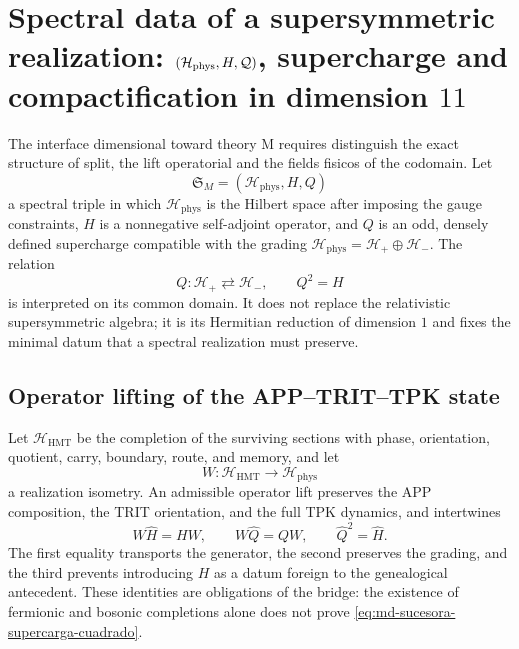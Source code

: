 \section{Spectral data of a supersymmetric realization: \((\mathcal H_{\rm phys},H,\mathcal Q)\), supercharge and compactification in dimension \(11\)}
\label{sec:md-sucesora-terna-supercarga-m}

The interface dimensional toward theory M requires distinguish the exact structure
of split, the lift operatorial and the fields fisicos of the codomain. Let
\[
 \mathfrak S_M=(\mathcal H_{\mathrm{phys}},H,Q)
\]
a spectral triple in which \(\mathcal H_{\mathrm{phys}}\) is the Hilbert
space after imposing the gauge constraints, \(H\) is a nonnegative
self-adjoint operator, and \(Q\) is an odd, densely defined supercharge
compatible with the grading
\(\mathcal H_{\mathrm{phys}}=\mathcal H_+\oplus\mathcal H_-\). The relation
\begin{equation}
 Q:\mathcal H_+\rightleftarrows\mathcal H_-,
 \qquad
 Q^2=H
 \label{eq:md-sucesora-supercarga-cuadrado}
\end{equation}
is interpreted on its common domain. It does not replace the relativistic
supersymmetric algebra; it is its Hermitian reduction of dimension \(1\) and fixes the minimal datum
that a spectral realization must preserve.

\subsection{Operator lifting of the APP--TRIT--TPK state}

Let \(\mathcal H_{\mathrm{HMT}}\) be the completion of the surviving sections
with phase, orientation, quotient, carry, boundary, route, and
memory, and let
\[
 W:\mathcal H_{\mathrm{HMT}}\longrightarrow\mathcal H_{\mathrm{phys}}
\]
a realization isometry. An admissible operator lift preserves
the APP composition, the TRIT orientation, and the full TPK dynamics,
and intertwines
\begin{equation}
 W\widehat H=HW,
 \qquad
 W\widehat Q=QW,
 \qquad
 \widehat Q^{2}=\widehat H.
 \label{eq:md-sucesora-lift-app-supercarga}
\end{equation}
The first equality transports the generator, the second preserves the grading,
and the third prevents introducing \(H\) as a datum foreign to the genealogical
antecedent. These identities are obligations of the bridge: the existence of
fermionic and bosonic completions alone does not prove
\eqref{eq:md-sucesora-supercarga-cuadrado}.

